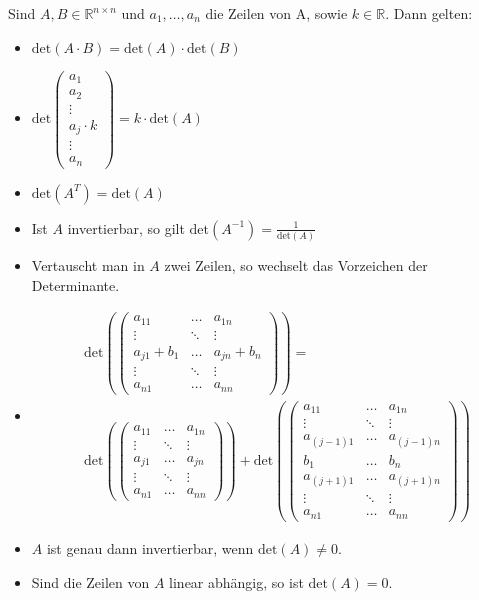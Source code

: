 Sind $A, B \in \mathbb{R}^{n \times n}$ und $a_1,\dots,a_n$ die Zeilen von A, sowie $k \in \mathbb{R}$. Dann gelten:
\begin{itemize}
	\item{$\text{det}(A\cdot B) = \text{det}(A) \cdot \text{det}(B)$}
	\item{$\text{det}\begin{pmatrix}a_1\\a_2\\\vdots\\a_j\cdot k\\\vdots\\a_n\end{pmatrix} = k \cdot \text{det}(A)$}
	\item{$\text{det}(A^T) = \text{det}(A)$}
	\item{Ist $A$ invertierbar, so gilt $\text{det}(A^{-1}) = \frac{1}{\text{det}(A)}$}
	\item{Vertauscht man in $A$ zwei Zeilen, so wechselt das Vorzeichen der Determinante.}
	\item{\begin{align*}
		&\text{det}\left(\begin{pmatrix}
			a_{11} & \dots & a_{1n} \\
			\vdots & \ddots & \vdots \\
			a_{j1}+b_1 & \dots & a_{jn} + b_n \\
			\vdots & \ddots & \vdots \\
			a_{n1} & \dots & a_{nn}
		\end{pmatrix}\right) =\\
		&\text{det}\left(\begin{pmatrix}
			a_{11} & \dots & a_{1n} \\
			\vdots & \ddots & \vdots \\
			a_{j1} & \dots & a_{jn} \\
			\vdots & \ddots & \vdots \\
			a_{n1} & \dots & a_{nn}
		\end{pmatrix}\right) + \text{det}\left(\begin{pmatrix}
			a_{11} & \dots & a_{1n} \\
			\vdots & \ddots & \vdots \\
			a_{(j-1)1} & \dots & a_{(j-1)n} \\
			b_1 & \dots & b_n \\
			a_{(j+1)1} & \dots & a_{(j+1)n} \\
			\vdots & \ddots & \vdots \\
			a_{n1} & \dots & a_{nn}
		\end{pmatrix}\right)
	\end{align*}}
	\item{$A$ ist genau dann invertierbar, wenn $\text{det}(A) \neq 0$.}
	\item{Sind die Zeilen von $A$ linear abhängig, so ist $\text{det}(A) = 0$.}
\end{itemize}

